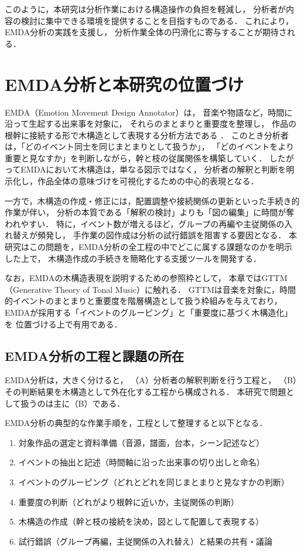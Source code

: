 このように，本研究は分析作業における構造操作の負担を軽減し，
分析者が内容の検討に集中できる環境を提供することを目指すものである．
これにより，EMDA分析の実践を支援し，
分析作業全体の円滑化に寄与することが期待される．

\section{EMDA分析と本研究の位置づけ}

EMDA（Emotion Movement Design Annotator）は，
音楽や物語など，時間に沿って生起する出来事を対象に，
それらのまとまりと重要度を整理し，
作品の根幹に接続する形で木構造として表現する分析方法である
\cite{emda2019rigolo, emdahomuratatu}．
このとき分析者は，「どのイベント同士を同じまとまりとして扱うか」，
「どのイベントをより重要と見なすか」を判断しながら，幹と枝の従属関係を構築していく．
したがってEMDAにおいて木構造は，単なる図示ではなく，
分析者の解釈と判断を明示化し，作品全体の意味づけを可視化するための中心的表現となる．

一方で，木構造の作成・修正には，配置調整や接続関係の更新といった手続き的作業が伴い，
分析の本質である「解釈の検討」よりも「図の編集」に時間が奪われやすい．
特に，イベント数が増えるほど，グループの再編や主従関係の入れ替えが頻発し，
手作業の図作成は分析の試行錯誤を阻害する要因となる．
本研究はこの問題を，EMDA分析の全工程の中でどこに属する課題なのかを明示した上で，
木構造作成の手続きを簡略化する支援ツールを開発する．

なお，EMDAの木構造表現を説明するための参照枠として，
本章ではGTTM（Generative Theory of Tonal Music）\cite{GTTM}に触れる．
GTTMは音楽を対象に，時間的イベントのまとまりと重要度を階層構造として扱う枠組みを与えており，
EMDAが採用する「イベントのグルーピング」と「重要度に基づく木構造化」を
位置づける上で有用である．


\subsection{EMDA分析の工程と課題の所在}

EMDA分析は，大きく分けると，
（A）分析者の解釈判断を行う工程と，
（B）その判断結果を木構造として外在化する工程から構成される．
本研究で問題として扱うのは主に（B）である．

EMDA分析の典型的な作業手順を，工程として整理すると以下となる．
\begin{enumerate}
  \item 対象作品の選定と資料準備（音源，譜面，台本，シーン記述など）
  \item イベントの抽出と記述（時間軸に沿った出来事の切り出しと命名）
  \item イベントのグルーピング（どれとどれを同じまとまりと見なすかの判断）
  \item 重要度の判断（どれがより根幹に近いか，主従関係の判断）
  \item 木構造の作成（幹と枝の接続を決め，図として配置して表現する）
  \item 試行錯誤（グループ再編，主従関係の入れ替え）と結果の共有・議論
\end{enumerate}

